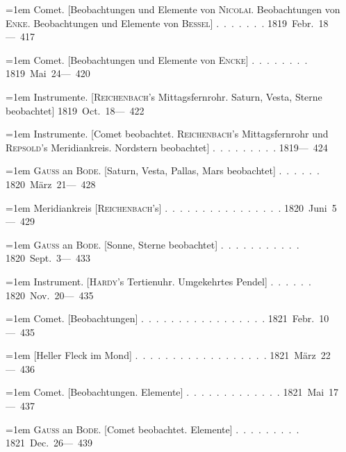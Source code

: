 \noindent\hangindent=1em Comet. [Beobachtungen und Elemente von \textsc{Nicolai}. Beobachtungen von \textsc{Enke}. Beobachtungen und Elemente von \textsc{Bessel}] \mbox{.\ .\ .\ .\ .\ .\ .} \hfill\mbox{1819 Febr. 18}\quad\mbox{--- 417}\par\smallskip
\noindent\hangindent=1em Comet. [Beobachtungen und Elemente von \textsc{Encke}] \mbox{.\ .\ .\ .\ .\ .\ .\ .} \hfill\mbox{1819 Mai 24}\quad\mbox{--- 420}\par\smallskip
\noindent\hangindent=1em Instrumente. [\textsc{Reichenbach}'s Mittagsfernrohr. Saturn, Vesta, Sterne beobachtet] \hfill\mbox{1819 Oct. 18}\quad\mbox{--- 422}\par\smallskip
\noindent\hangindent=1em Instrumente. [Comet beobachtet. \textsc{Reichenbach}'s Mittagsfernrohr und \textsc{Repsold}'s Meridiankreis. Nordstern beobachtet] \mbox{.\ .\ .\ .\ .\ .\ .\ .\ .} \hfill\mbox{1819}\quad\mbox{--- 424}\par\smallskip
\noindent\hangindent=1em \textsc{Gauss} an \textsc{Bode}. [Saturn, Vesta, Pallas, Mars beobachtet] \mbox{.\ .\ .\ .\ .\ .} \hfill\mbox{1820 März 21}\quad\mbox{--- 428}\par\smallskip
\noindent\hangindent=1em Meridiankreis [\textsc{Reichenbach}'s] \mbox{.\ .\ .\ .\ .\ .\ .\ .\ .\ .\ .\ .\ .\ .\ .\ .} \hfill\mbox{1820 Juni 5}\quad\mbox{--- 429}\par\smallskip
\noindent\hangindent=1em \textsc{Gauss} an \textsc{Bode}. [Sonne, Sterne beobachtet] \mbox{.\ .\ .\ .\ .\ .\ .\ .\ .\ .\ .} \hfill\mbox{1820 Sept. 3}\quad\mbox{--- 433}\par\smallskip
\noindent\hangindent=1em Instrument. [\textsc{Hardy}'s Tertienuhr. Umgekehrtes Pendel] \mbox{.\ .\ .\ .\ .\ .} \hfill\mbox{1820 Nov. 20}\quad\mbox{--- 435}\par\smallskip
\noindent\hangindent=1em Comet. [Beobachtungen] \mbox{.\ .\ .\ .\ .\ .\ .\ .\ .\ .\ .\ .\ .\ .\ .\ .\ .} \hfill\mbox{1821 Febr. 10}\quad\mbox{--- 435}\par\smallskip
\noindent\hangindent=1em [Heller Fleck im Mond] \mbox{.\ .\ .\ .\ .\ .\ .\ .\ .\ .\ .\ .\ .\ .\ .\ .\ .\ .} \hfill\mbox{1821 März 22}\quad\mbox{--- 436}\par\smallskip
\noindent\hangindent=1em Comet. [Beobachtungen. Elemente] \mbox{.\ .\ .\ .\ .\ .\ .\ .\ .\ .\ .\ .\ .} \hfill\mbox{1821 Mai 17}\quad\mbox{--- 437}\par\smallskip
\noindent\hangindent=1em \textsc{Gauss} an \textsc{Bode}. [Comet beobachtet. Elemente] \mbox{.\ .\ .\ .\ .\ .\ .\ .\ .} \hfill\mbox{1821 Dec. 26}\quad\mbox{--- 439}\par\smallskip
